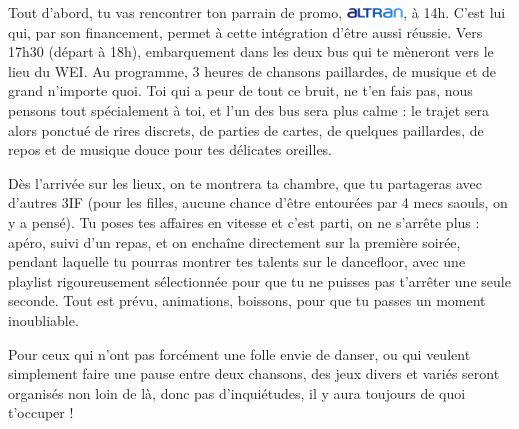 Tout d'abord, tu vas rencontrer ton parrain de promo,
     \includegraphics[height=7.5pt]{images/logoAltran.jpg}, à 14h.
C'est lui qui,
par son financement, permet à cette intégration d'être aussi réussie.
Vers 17h30 (départ à 18h), embarquement dans les deux bus qui te mèneront vers le lieu du
WEI. Au programme, 3 heures de chansons paillardes, de musique et de grand
n'importe quoi.
Toi qui a peur de tout ce bruit, ne t'en fais pas, nous pensons tout
spécialement à toi, et l'un des bus sera plus calme : le trajet sera alors ponctué de
rires discrets, de parties de cartes, de quelques paillardes, de repos et de
musique douce pour tes délicates oreilles.

\vspace{1em}

Dès l'arrivée sur les lieux, on te montrera ta chambre, que tu partageras avec
d'autres 3IF (pour les filles, aucune chance d'être entourées par 4 mecs saouls,
on y a pensé). Tu poses tes affaires en vitesse et c'est parti, on ne s'arrête
plus : apéro, suivi d'un repas, et on enchaîne directement sur la première
soirée, pendant laquelle tu pourras montrer tes talents sur le dancefloor, avec
une playlist rigoureusement sélectionnée pour que tu ne puisses pas t'arrêter une
seule seconde. Tout est prévu, animations, boissons, pour que tu passes un
moment inoubliable.

\vspace{1em}

Pour ceux qui n'ont pas forcément une folle envie de danser, ou
qui veulent simplement faire une pause entre deux chansons, des jeux divers et variés seront
organisés non loin de là, donc pas d'inquiétudes, il y aura toujours de quoi t'occuper !
  
